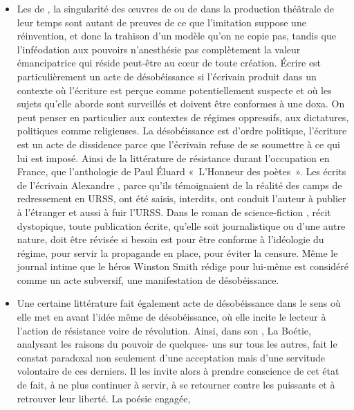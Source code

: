 {\begin{itemize}
\item Les  de , la singularité des œuvres de  ou de 
dans la production théâtrale de leur temps sont autant de preuves de ce que
l'imitation suppose une réinvention, et donc la trahison d'un modèle qu'on ne
copie pas, tandis que l'inféodation aux pouvoirs n'anesthésie pas
complètement la valeur émancipatrice qui réside peut-être au cœur de toute
création. Écrire est particulièrement un acte de désobéissance si l'écrivain
produit dans un contexte où l'écriture est perçue comme potentiellement
suspecte et où les sujets qu'elle aborde sont surveillés et doivent être
conformes à une doxa. On peut penser en particulier aux contextes de
régimes oppressifs, aux dictatures, politiques comme religieuses. La
désobéissance est d'ordre politique, l'écriture est un acte de dissidence parce
que l'écrivain refuse de se soumettre à ce qui lui est imposé. Ainsi de la
littérature de résistance durant l'occupation en France, que l'anthologie de
Paul Éluard «~L'Honneur des poètes~». Les écrits de l'écrivain
Alexandre , parce qu'ils témoignaient de la réalité des camps de
redressement en URSS, ont été saisis, interdits, ont conduit l'auteur à publier
à l'étranger et aussi à fuir l'URSS. Dans le roman de science-fiction , récit
dystopique, toute publication écrite, qu'elle soit journalistique ou d'une autre
nature, doit être révisée si besoin est pour être conforme à l'idéologie du
régime, pour servir la propagande en place, pour éviter la censure. Même le
journal intime que le héros Winston Smith rédige pour lui-même est considéré
comme un acte subversif, une manifestation de désobéissance.
\item Une certaine littérature fait également acte de désobéissance dans le sens où
elle met en avant l'idée même de désobéissance, où elle incite le lecteur à
l'action de résistance voire de révolution. Ainsi, dans son , La Boétie, analysant les raisons du pouvoir de quelques-
uns sur tous les autres, fait le constat paradoxal non seulement d'une
acceptation mais d'une servitude volontaire de ces derniers. Il les invite alors à
prendre conscience de cet état de fait, à ne plus continuer à servir, à se
retourner contre les puissants et à retrouver leur liberté. La poésie engagée,

\end{itemize}}

